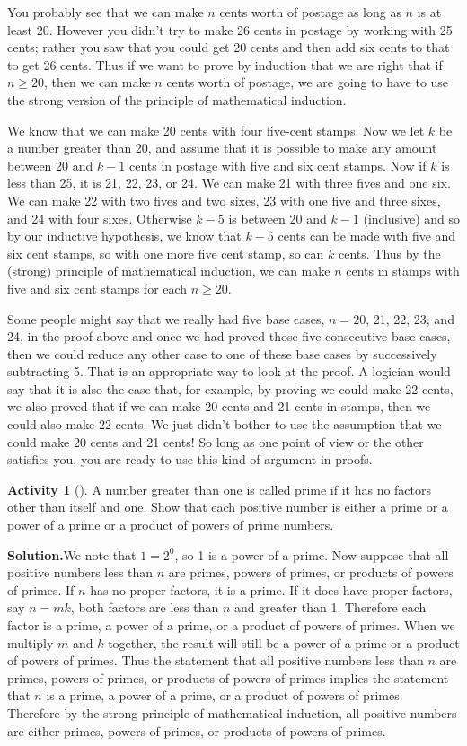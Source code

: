 \documentclass[10pt,]{book}
\theoremstyle{plain}
\theoremstyle{definition}
\newtheorem{activity}[project]{Activity}
\numberwithin{equation}{chapter}
\begin{document}
You probably see that we can make \(n\) cents worth of postage as long as \(n\) is at least 20. However you didn't try to make 26 cents in postage by working with 25 cents; rather you saw that you could get 20 cents and then add six cents to that to get 26 cents. Thus if we want to prove by induction that we are right that if \(n\ge 20\), then we can make \(n\) cents worth of postage, we are going to have to use the strong version of the principle of mathematical induction.%
\par
We know that we can make 20 cents with four five-cent stamps. Now we let \(k\) be a number greater than 20, and assume that it is possible to make any amount between 20 and \(k-1\) cents in postage with five and six cent stamps. Now if \(k\) is less than 25, it is 21, 22, 23, or 24. We can make 21 with three fives and one six. We can make 22 with two fives and two sixes, 23 with one five and three sixes, and 24 with four sixes. Otherwise \(k-5\) is between 20 and \(k-1\) (inclusive) and so by our inductive hypothesis, we know that \(k-5\) cents can be made with five and six cent stamps, so with one more five cent stamp, so can \(k\) cents. Thus by the (strong) principle of mathematical induction, we can make \(n\) cents in stamps with five and six cent stamps for each \(n\ge 20\).%
\par
Some people might say that we really had five base cases, \(n=20\), 21, 22, 23, and 24, in the proof above and once we had proved those five consecutive base cases, then we could reduce any other case to one of these base cases by successively subtracting 5. That is an appropriate way to look at the proof. A logician would say that it is also the case that, for example, by proving we could make 22 cents, we also proved that if we can make 20 cents and 21 cents in stamps, then we could also make 22 cents. We just didn't bother to use the assumption that we could make 20 cents and 21 cents! So long as one point of view or the other satisfies you, you are ready to use this kind of argument in proofs.%
\begin{activity}[]\label{activity-334}
A number greater than one is called prime if it has no factors other than itself and one. Show that each positive number is either a prime or a power of a prime or a product of powers of prime numbers.%
\par\medskip\noindent%
\textbf{Solution.}\quad We note that \(1=2^0\), so 1 is a power of a prime. Now suppose that all positive numbers less than \(n\) are primes, powers of primes, or products of powers of primes. If \(n\) has no proper factors, it is a prime.  If it does have proper factors, say \(n=mk\), both factors are less than \(n\) and greater than 1. Therefore each factor is a prime, a power of a prime, or a product of powers of primes. When we multiply \(m\) and \(k\) together, the result will still be a power of a prime or a product of powers of primes. Thus the statement that all positive numbers less than \(n\) are primes, powers of primes, or products of powers of primes implies the statement that \(n\) is a prime, a power of a prime, or a product of powers of primes. Therefore by the strong principle of mathematical induction, all positive numbers are either primes, powers of primes, or products of powers of primes.%
\end{activity}
\end{document}
